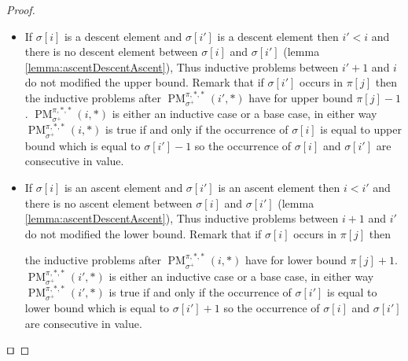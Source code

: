 \documentclass[a4paper]{llncs}
\newcommand{\ptext}{\pi}
\newcommand{\pmotif}{\sigma}
\newcommand{\pbmotif}{\pmotif^+}
\DeclareMathOperator{\PMa}{PM}
\newcommand{\PM}[6]{\PMa_{{#1}}^{{#2},{#3},{#4}}({#5},{#6})}
\begin{document}
\begin{proof}
\begin{itemize}
\begin{itemize}
			\item If $\pmotif[i]$ is a descent element and $\pmotif[i']$ is a descent element then $i'<i$ and there is no descent element between $\pmotif[i]$ and $\pmotif[i']$ (lemma \ref{lemma:ascentDescentAscent}), Thus inductive problems between $i'+1$ and $i$ do not modified the upper bound. Remark that if $\pmotif[i']$ occurs in $\ptext[j]$ then 
			the inductive problems after $\PM{\pbmotif}{\ptext}{*}{*}{i'}{*}$ have for upper bound $\ptext[j]-1$. $\PM{\pbmotif}{\ptext}{*}{*}{i}{*}$ is either an inductive case or a base case, in either way  $\PM{\pbmotif}{\ptext}{*}{*}{i}{*}$ is true if and only if the occurrence of $\sigma[i]$ is equal to upper bound which is equal to $\sigma[i']-1$ so the occurrence of $\pmotif[i]$ and $\pmotif[i']$ are consecutive in value.
			
			\item If $\pmotif[i]$ is an ascent element and $\pmotif[i']$ is an ascent element then $i<i'$ and there is no  ascent element between $\pmotif[i]$ and $\pmotif[i']$ (lemma \ref{lemma:ascentDescentAscent}), Thus inductive problems between $i+1$ and $i'$ do not modified the lower bound. Remark that if $\pmotif[i]$ occurs in $\ptext[j]$ then 

			the inductive problems after $\PM{\pbmotif}{\ptext}{*}{*}{i}{*}$ have for lower bound $\ptext[j]+1$. $\PM{\pbmotif}{\ptext}{*}{*}{i'}{*}$ is either an inductive case or a base case, in either way  $\PM{\pbmotif}{\ptext}{*}{*}{i'}{*}$ is true if and only if the occurrence of $\sigma[i']$ is equal to lower bound which is equal to $\sigma[i']+1$ so the occurrence of $\pmotif[i]$ and $\pmotif[i']$ are consecutive in value.
		\end{itemize}







\end{itemize}
$\qed$
\end{proof}
\end{document}

